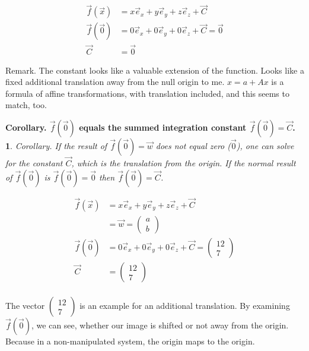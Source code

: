 \documentclass[a4paper]{article}
\begin{document}
\begin{Example}
\begin{displaymath}
\begin{align}
\vec{f}(\vec{x}) &= x\vec{e}_{x} + y\vec{e}_{y} + z\vec{e}_{z} + \vec{C}\\
\vec{f}(\vec{0}) &= 0\vec{e}_{x} + 0\vec{e}_{y} + 0\vec{e}_{z} + \vec{C} = \vec{0}\\
\vec{C} &= \vec{0}
\end{align}
\end{displaymath}

Remark. The constant looks like a valuable extension of the function. Looks like a fixed additional translation away from the null origin to me. $x=a+Ax$ is a formula of affine transformations, with translation included, and this seems to match, too.\\

\newtheorem{CorollaryConstant}{Corollary. $\vec{f}(\vec{0})$ equals the summed integration constant $\vec{f}(\vec{0})=\vec{C}$.}
\begin{CorollaryConstant}
Corollary. If the result of $\vec{f}({\vec{0}})=\vec{w}$ does not equal zero ($\vec{0}$), one can solve for the constant $\vec{C}$, which is the translation from the origin. If the normal result of $\vec{f}({\vec{0}})$ is $\vec{f}({\vec{0}})=\vec{0}$ then $\vec{f}({\vec{0}})=\vec{C}$.
\end{CorollaryConstant}

\begin{displaymath}
\begin{align}
\vec{f}(\vec{x}) &= x\vec{e}_{x} + y\vec{e}_{y} + z\vec{e}_{z} + \vec{C}\\ &= \vec{w} = \begin{pmatrix}a\\b\end{pmatrix}\\
\vec{f}(\vec{0}) &= 0\vec{e}_{x} + 0\vec{e}_{y} + 0\vec{e}_{z} + \vec{C} = \begin{pmatrix}12\\7\end{pmatrix}\\
\vec{C} &= \begin{pmatrix}12\\7\end{pmatrix}\\
\end{align}
\end{displaymath}

The vector $\begin{pmatrix}12\\7\end{pmatrix}$ is an example for an additional translation. By examining $\vec{f}(\vec{0})$, we can see, whether our image is shifted or not away from the origin. Because in a non-manipulated system, the origin maps to the origin. \\


\end{Example}
\end{document}
